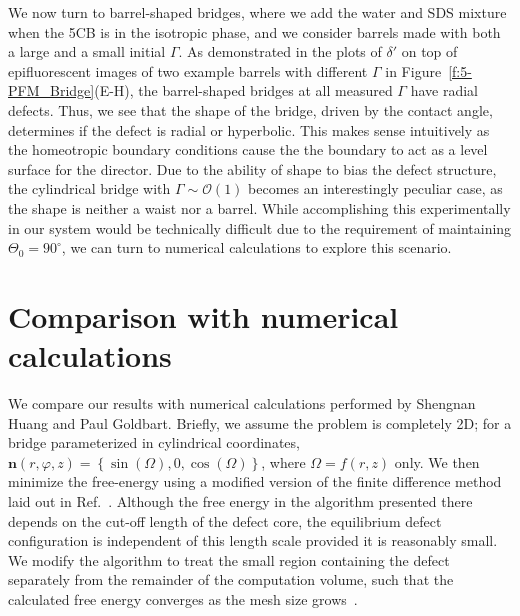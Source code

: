 We now turn to barrel-shaped bridges, where we add the water and SDS mixture when the 5CB is in the isotropic phase, and we consider barrels made with both a large and a small initial $\Gamma$.
As demonstrated in the plots of $\delta'$ on top of epifluorescent images of two example barrels with different $\Gamma$ in Figure~\ref{f:5-PFM_Bridge}(E-H), the barrel-shaped bridges at all measured $\Gamma$ have radial defects.
Thus, we see that the shape of the bridge, driven by the contact angle, determines if the defect is radial or hyperbolic.
This makes sense intuitively as the homeotropic boundary conditions cause the the boundary to act as a level surface for the director.
Due to the ability of shape to bias the defect structure, the cylindrical bridge with $\Gamma \sim \mathcal{O}\left (1 \right )$ becomes an interestingly peculiar case, as the shape is neither a waist nor a barrel.
While accomplishing this experimentally in our system would be technically difficult due to the requirement of maintaining $\Theta_0 = 90^{\circ}$, we can turn to numerical calculations to explore this scenario.




\section{Comparison with numerical calculations}
We compare our results with numerical calculations performed by Shengnan Huang and Paul Goldbart.
Briefly, we assume the problem is completely 2D; for a bridge parameterized in cylindrical coordinates, $\mathbf{n}(r,\varphi,z) = \left \{ \sin(\Omega), 0, \cos(\Omega)   \right \}$, where $\Omega = f(r,z)$ only.
We then minimize the free-energy using a modified version of the finite difference method laid out in Ref.~\cite{RN144}.
Although the free energy in the algorithm presented there depends on the cut-off length of the defect core, the equilibrium defect configuration is independent of this length scale provided it is reasonably small.
We modify the algorithm to treat the small region containing the defect separately from the remainder of the computation volume, such that the calculated free energy converges as the mesh size grows~\cite{RN199,RN200,RN201}.

